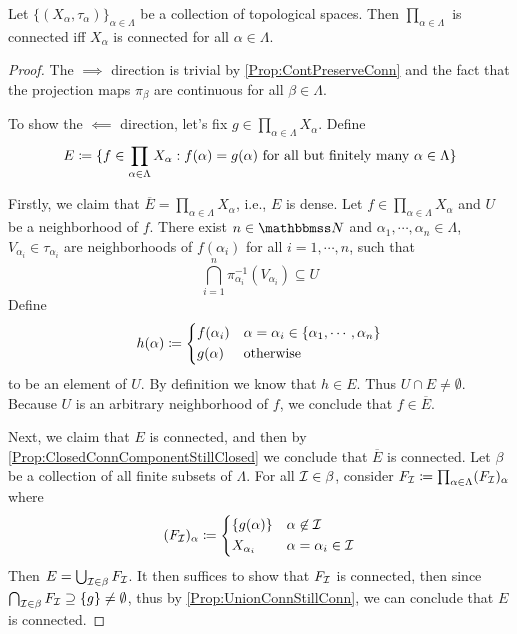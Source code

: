 \documentclass[screen,single]{techreport}
\numberwithin{equation}{section}
\begin{document}
\begin{theorem}\label{The:ProdConnIffEachConn}
	Let $\{(X_\alpha,\tau_\alpha)\}_{\alpha \in \Lambda}$ be a collection of topological spaces.
	Then $\prod_{\alpha \in \Lambda}$ is connected iff $X_\alpha$ is connected for all $\alpha \in \Lambda$.
\end{theorem}
\begin{proof}
	The $\implies$ direction is trivial by \cref{Prop:ContPreserveConn} and the fact that the projection maps $\pi_\beta$ are continuous for all $\beta \in \Lambda$.
	
	To show the $\impliedby$ direction, let's fix $g \in \prod_{\alpha \in \Lambda} X_\alpha$. Define
	\[
	E \coloneqq \{ { f \in \prod_{\alpha \in \Lambda} X_\alpha : f(\alpha)=g(\alpha)~\text{for all but finitely many $\alpha \in \Lambda$} } \}
	\]
	
	Firstly, we claim that $\overline{E} = \prod_{\alpha \in \Lambda} X_\alpha$, i.e., $E$ is dense.
	Let $f \in \prod_{\alpha \in \Lambda} X_\alpha$ and $U$ be a neighborhood of $f$.
	There exist $n \in \bbN$ and $\alpha_1,\cdots,\alpha_n \in \Lambda$, $V_{\alpha_i} \in \tau_{\alpha_i}$ are neighborhoods of $f(\alpha_i)$ for all $i=1,\cdots,n$, such that
	\[
	\bigcap_{i=1}^n \pi_{\alpha_i}^{-1}(V_{\alpha_i}) \subseteq U
	\]
	Define
	\[
	h(\alpha) \coloneqq \begin{dcases}
 		f(\alpha_i) & \alpha=\alpha_i  \in \{ \alpha_1,\cdots, \alpha_n \} \\
 		g(\alpha) & \text{otherwise}
 	\end{dcases}
	\]
	to be an element of $U$.
	By definition we know that $h \in E$.
	Thus $U \cap E \neq \emptyset$.
	Because $U$ is an arbitrary neighborhood of $f$, we conclude that $f \in \overline{E}$.
	
	Next, we claim that $E$ is connected, and then by \cref{Prop:ClosedConnComponentStillClosed} we conclude that $\overline{E}$ is connected.
	Let $\beta$ be a collection of all finite subsets of $\Lambda$.
	For all $\mathcal{I} \in \beta$, consider $F_{\mathcal{I}} \coloneqq \prod_{\alpha \in \Lambda} (F_{\mathcal{I}})_\alpha$ where
	\[
	(F_{\mathcal{I}})_\alpha \coloneqq \begin{dcases}
 		\{ g(\alpha)\} & \alpha \not\in \mathcal{I} \\
 		X_{\alpha_i} & \alpha=\alpha_i \in \mathcal{I}
 	\end{dcases}
	\]
	Then $E = \bigcup_{\mathcal{I} \in \beta} F_{\mathcal{I}}$.
	It then suffices to show that $F_{\mathcal{I}}$ is connected, then since $\bigcap_{\mathcal{I} \in \beta} F_{\mathcal{I}} \supseteq \{g\} \neq \emptyset$, thus by \cref{Prop:UnionConnStillConn}, we can conclude that $E$ is connected.
	

\end{proof}
\end{document}
